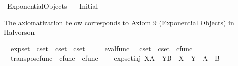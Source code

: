 %
\begin{isabellebody}%
%
%
\isadelimdocument
%
\endisadelimdocument
%
\isatagdocument
%
\isamarkuptrue%
%
\endisatagdocument
{\isafolddocument}%
%
\isadelimdocument
%
\endisadelimdocument
%
\isadelimtheory
%
\endisadelimtheory
%
\isatagtheory
{}\isamarkupfalse%
\ Exponential{\isacharunderscore}{\kern0pt}Objects\isanewline
\ \ \ Initial\isanewline
{}%
\endisatagtheory
{\isafoldtheory}%
%
\isadelimtheory
%
\endisadelimtheory
%
\begin{isamarkuptext}%
The axiomatization below corresponds to Axiom 9 (Exponential Objects) in Halvorson.%
\end{isamarkuptext}\isamarkuptrue%
\isamarkupfalse%
\isanewline
\ \ exp{\isacharunderscore}{\kern0pt}set\ {\isacharcolon}{\kern0pt}{\isacharcolon}{\kern0pt}\ {\isachardoublequoteopen}cset\ {\isasymRightarrow}\ cset\ {\isasymRightarrow}\ cset{\isachardoublequoteclose}\ {\isacharparenleft}{\kern0pt}{\isachardoublequoteopen}{\isacharunderscore}{\kern0pt}\isactrlbsup {\isacharunderscore}{\kern0pt}\isactrlesup {\isachardoublequoteclose}\ {\isacharbrackleft}{\kern0pt}{}{}{}{\isacharcomma}{\kern0pt}{}{}{}{\isacharbrackright}{\kern0pt}{}{}{}{\isacharparenright}{\kern0pt}\ \isanewline
\ \ eval{\isacharunderscore}{\kern0pt}func\ \ {\isacharcolon}{\kern0pt}{\isacharcolon}{\kern0pt}\ {\isachardoublequoteopen}cset\ {\isasymRightarrow}\ cset\ {\isasymRightarrow}\ cfunc{\isachardoublequoteclose}\ \isanewline
\ \ transpose{\isacharunderscore}{\kern0pt}func\ {\isacharcolon}{\kern0pt}{\isacharcolon}{\kern0pt}\ {\isachardoublequoteopen}cfunc\ {\isasymRightarrow}\ cfunc{\isachardoublequoteclose}\ {\isacharparenleft}{\kern0pt}{\isachardoublequoteopen}{\isacharunderscore}{\kern0pt}\isactrlsup {\isasymsharp}{\isachardoublequoteclose}\ {\isacharbrackleft}{\kern0pt}{}{}{}{\isacharbrackright}{\kern0pt}{}{}{}{\isacharparenright}{\kern0pt}\isanewline
{}\isanewline
\ \ exp{\isacharunderscore}{\kern0pt}set{\isacharunderscore}{\kern0pt}inj{\isacharcolon}{\kern0pt}\ {\isachardoublequoteopen}X\isactrlbsup A\isactrlesup \ {\isacharequal}{\kern0pt}\ Y\isactrlbsup B\isactrlesup \ {\isasymLongrightarrow}\ X\ {\isacharequal}{\kern0pt}\ Y\ {\isasymand}\ A\ {\isacharequal}{\kern0pt}\ B{\isachardoublequoteclose}\ \isanewline

\end{isabellebody}
